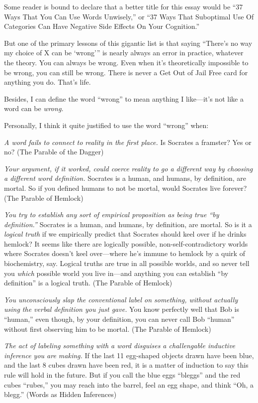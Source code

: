{
 Some reader is bound to declare that a better title for this essay
would be ``37 Ways That You Can Use Words
Unwisely,'' or ``37 Ways That
Suboptimal Use Of Categories Can Have Negative Side Effects On Your
Cognition.'' }

{
 But one of the primary lessons of this gigantic list is that
saying ``There's no way my choice of X
can be `wrong''' is
nearly always an error in practice, whatever the theory. You can always
be wrong. Even when it's theoretically impossible to be
wrong, you can still be wrong. There is never a Get Out of Jail Free
card for anything you do. That's life.}

{
 Besides, I can define the word
``wrong'' to mean anything I
like---it's not like a word can be \textit{wrong.}}

{
 Personally, I think it quite justified to use the word
``wrong'' when:}

{
 \textit{A word fails to connect to reality in the first place.} Is
Socrates a framster? Yes or no? (The Parable of the Dagger)}

{
 \textit{Your argument, if it worked, could coerce reality to go a
different way by choosing a different word definition.} Socrates is a
human, and humans, by definition, are mortal. So if you defined humans
to not be mortal, would Socrates live forever? (The Parable of
Hemlock)}

{
 \textit{You try to establish any sort of empirical proposition as
being true ``by definition.''}
Socrates is a human, and humans, by definition, are mortal. So is it a
\textit{logical truth} if we empirically predict that Socrates should
keel over if he drinks hemlock? It seems like there are logically
possible, non-self-contradictory worlds where Socrates
doesn't keel over---where he's immune
to hemlock by a quirk of biochemistry, say. Logical truths are true in
all possible worlds, and so never tell you \textit{which} possible
world you live in---and anything you can establish
``by definition'' is a logical
truth. (The Parable of Hemlock)}

{
 \textit{You unconsciously slap the conventional label on
something, without actually using the verbal definition you just gave.}
You know perfectly well that Bob is
``human,'' even though, by your
definition, you can never call Bob
``human'' without first observing
him to be mortal. (The Parable of Hemlock)}

{
 \textit{The act of labeling something with a word disguises a
challengable inductive inference you are making.} If the last 11
egg-shaped objects drawn have been blue, and the last 8 cubes drawn
have been red, it is a matter of induction to say this rule will hold
in the future. But if you call the blue eggs
``bleggs'' and the red cubes
``rubes,'' you may reach into the
barrel, feel an egg shape, and think ``Oh, a
blegg.'' (Words as Hidden Inferences)}

